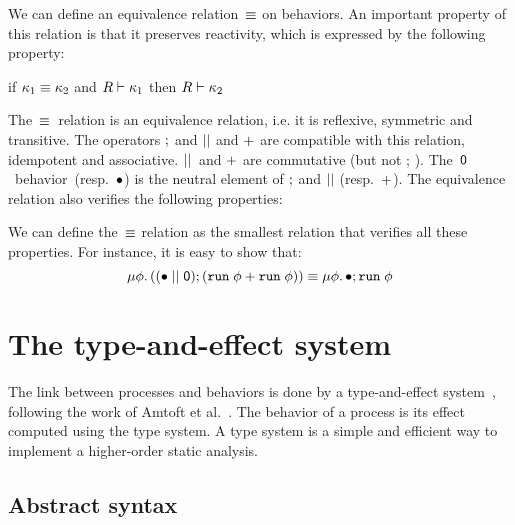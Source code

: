 \documentclass[9pt,preprint]{sigplanconf}
\begin{document}
We can define an equivalence relation~$\equiv$ on behaviors. An important property of this relation is that it preserves reactivity, which is expressed by the following property:
\begin{property}
\label{prop:equiv_reactivty}
if $\kappa_1 \equiv \kappa_2$ and $R \vdash \kappa_1$ then $R \vdash \kappa_2$
\end{property}

The~$\equiv$~relation is an equivalence relation, i.e. it is reflexive, symmetric and transitive. The operators $;$ and $ \mid\mid $ and $+$ are compatible with this relation, idempotent and associative. $ \mid\mid $~and $+$ are commutative (but not $;\,$). The~$\textsf{0}$~behavior~(resp.~$\bullet$) is the neutral element of $;$ and $ \mid\mid $ (resp.~$+$). The equivalence relation also verifies the following properties:
%

We can define the~$\equiv$ relation as the smallest relation that verifies all these properties.  For instance, it is easy to show that:
\[
\mu \phi.\, ((\bullet \mid\mid \textsf{0}) ; (\mathtt{run}\; \phi + \mathtt{run}\; \phi))  \equiv  \mu \phi.\, \bullet ; \mathtt{run}\; \phi
\]

\section{The type-and-effect system}
\label{sec:type_system}

The link between processes and behaviors is done by a type-and-effect system~\cite{Lucassen:1988}, following the work of Amtoft et al.~\cite{Amtoft:1999}. The behavior of a process is its effect computed using the type system. A type system is a simple and efficient way to implement a higher-order static analysis.

\subsection{Abstract syntax}
\end{document}
